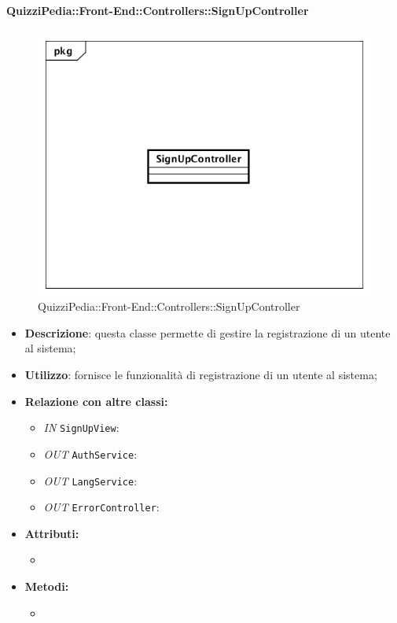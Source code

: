 \paragraph{QuizziPedia::Front-End::Controllers::SignUpController}
\begin{figure}
	\centering
	\includegraphics[scale=0.45]{UML/Classi/Front-End/QuizziPedia_Front-end_Controller_SignUpController.png}
	\caption{QuizziPedia::Front-End::Controllers::SignUpController}
\end{figure}
\begin{itemize}
	\item \textbf{Descrizione}: questa classe permette di gestire la registrazione di un utente al sistema;
	\item \textbf{Utilizzo}: fornisce le funzionalità di registrazione di un utente al sistema;
	\item \textbf{Relazione con altre classi:}
	\begin{itemize}
		\item \textit{IN} \texttt{SignUpView}:
		\item \textit{OUT} \texttt{AuthService}: 
		\item \textit{OUT} \texttt{LangService}: 
		\item \textit{OUT} \texttt{ErrorController}:  
	\end{itemize}
	\item \textbf{Attributi:}
	\begin{itemize}
		\item 
	\end{itemize}
	\item \textbf{Metodi:}
	\begin{itemize}
		\item 
	\end{itemize}
\end{itemize}

